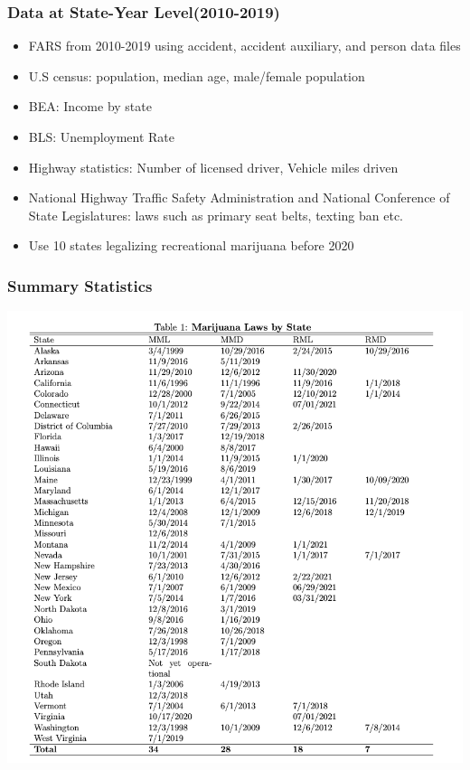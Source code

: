 \documentclass{beamer}
\begin{document}
\begin{frame} %
\frametitle{Data at State-Year Level(2010-2019)}
	\begin{itemize}
	
		\item
		FARS from 2010-2019 using accident, accident auxiliary, and person data files
		\item
		U.S census: population, median age, male/female population
		\item
		BEA: Income by state
		\item
		BLS: Unemployment Rate
		\item
		Highway statistics: Number of licensed driver, Vehicle miles driven 		
		\item
		National Highway Traffic Safety Administration and National Conference of State Legislatures: laws such as primary seat belts, texting ban etc. 
		\item 
		Use 10 states legalizing recreational marijuana before 2020
		
	\end{itemize}
\end{frame} 

\begin{frame} %
\frametitle{Summary Statistics}

	\includegraphics[scale = 0.25]{table1}

\end{frame}
\end{document}
